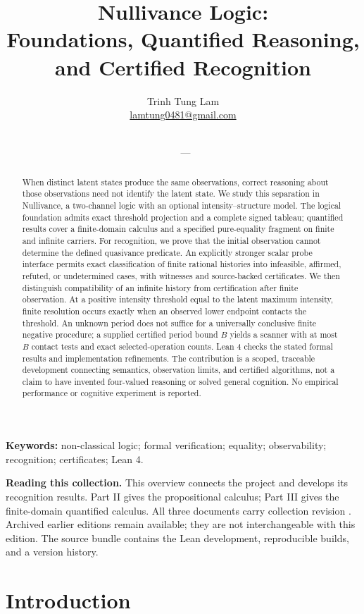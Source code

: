 \documentclass[11pt,a4paper]{article}
\title{Nullivance Logic:\\Foundations, Quantified Reasoning,\\and Certified Recognition}
\author{Trinh Tung Lam\\\small\href{mailto:lamtung0481@gmail.com}{lamtung0481@gmail.com}}
\date{\PublicationDate\\\small \PublicationPart\ --- \PublicationVersion}
\begin{document}
\maketitle
\begin{abstract}
When distinct latent states produce the same observations, correct reasoning
about those observations need not identify the latent state. We study this
separation in Nullivance, a two-channel logic with an optional intensity--structure
model. The logical foundation admits exact threshold projection and a complete
signed tableau; quantified results cover a finite-domain calculus and a specified
pure-equality fragment on finite and infinite carriers. For recognition, we prove
that the initial observation cannot determine the defined quasivance predicate.
An explicitly stronger scalar probe interface permits exact classification of
finite rational histories into infeasible, affirmed, refuted, or undetermined
cases, with witnesses and source-backed certificates. We then distinguish
compatibility of an infinite history from certification after finite observation.
At a positive intensity threshold equal to the latent maximum intensity, finite
resolution occurs exactly when an observed lower endpoint contacts the threshold.
An unknown period does not suffice for a universally conclusive finite negative
procedure; a supplied certified period bound $B$ yields a scanner with at most
$B$ contact tests and exact selected-operation counts. Lean 4 checks the stated
formal results and implementation refinements. The contribution is a scoped,
traceable development connecting semantics, observation limits, and certified
algorithms, not a claim to have invented four-valued reasoning or solved general
cognition. No empirical performance or cognitive experiment is reported.
\end{abstract}
\noindent\textbf{Keywords:} non-classical logic; formal verification; equality;
observability; recognition; certificates; Lean 4.
\par\medskip
\noindent\textbf{Reading this collection.} This overview connects the project
and develops its recognition results. Part II gives the propositional calculus;
Part III gives the finite-domain quantified calculus. All three documents carry
collection revision \PublicationVersion. Archived earlier editions remain
available; they are not interchangeable with this edition. The source bundle
contains the Lean development, reproducible builds, and a version history.
\clearpage
\tableofcontents
\newpage

\section{Introduction}
\label{sec:scope}
\end{document}
